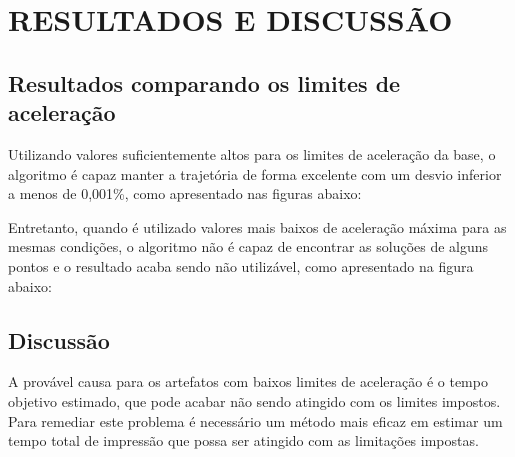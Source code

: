 \chapter{RESULTADOS E DISCUSSÃO}

\section{Resultados comparando os limites de aceleração}
Utilizando valores suficientemente altos para os limites de 
aceleração da base, o algoritmo é capaz manter a trajetória 
de forma excelente com um desvio inferior a menos de 0,001\%, 
como apresentado nas figuras abaixo:

Entretanto, quando é utilizado valores mais baixos de aceleração 
máxima para as mesmas condições, o algoritmo não é capaz de 
encontrar as soluções de alguns pontos e o resultado acaba 
sendo não utilizável, como apresentado na figura abaixo:

\section{Discussão}
A provável causa para os artefatos com baixos limites de 
aceleração é o tempo objetivo estimado, que pode acabar não 
sendo atingido com os limites impostos. Para remediar este 
problema é necessário um método mais eficaz em estimar um 
tempo total de impressão que possa ser atingido com as 
limitações impostas.





